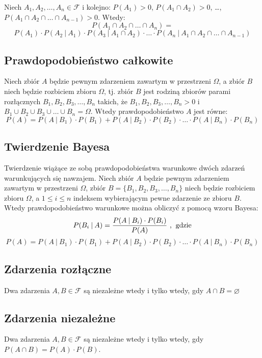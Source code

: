 \documentclass[14pt,a4paper]{extarticle}
\begin{document}
\noindent Niech $A_{1}, A_{2}, \ldots, A_{n} \in \mathcal{F}$ i kolejno: $P(A_{1})>0$, 
$P(A_{1}\cap A_{2}) > 0$, \ldots, $P(A_{1}\cap A_{2} \cap \ldots \cap A_{n-1}) > 0$. Wtedy:
\[P(A_{1}\cap A_{2}\cap \ldots\cap A_{n}) = \]
\[P(A_{1}) \cdot P(A_{2} \:\vert\: A_{1}) \cdot P(A_{3} \:\vert\: A_{1} \cap A_{2}) \cdot \ldots \cdot P(A_{n}\:\vert\:A_{1}\cap A_{2}\cap \ldots\cap A_{n-1})\]

\newpage
\subsection{Prawdopodobieństwo całkowite}
Niech zbiór $A$ będzie pewnym zdarzeniem zawartym w przestrzeni $\Omega$, a zbiór
$B$ niech będzie rozbiciem zbioru $\Omega$, tj. zbiór $B$ jest rodziną zbiorów parami rozłącznych
$B_{1}, B_{2}, B_{3}, \ldots, B_{n}$ takich, że $B_{1}, B_{2}, B_{3}, \ldots, B_{n} > 0$ i 
$B_{1}\cup B_{2}\cup B_{3}\cup \ldots\cup B_{n} = \Omega$. Wtedy prawdopodobieństwo $A$ jest równe:
\[P(A) = P(A\:\vert\:B_{1})\cdot P(B_{1}) + P(A\:\vert\:B_{2})\cdot P(B_{2}) \cdot \ldots \cdot P(A\:\vert\:B_{n})\cdot P(B_{n})\]


\subsection{Twierdzenie Bayesa}
Twierdzenie wiążące ze sobą prawdopodobieństwa warunkowe dwóch zdarzeń warunkujących
się nawzajem. Niech zbiór $A$ będzie pewnym zdarzeniem zawartym w przestrzeni $\Omega$, zbiór
$B = \{B_{1}, B_{2}, B_{3}, \ldots, B_{n}\}$ niech będzie rozbiciem zbioru $\Omega$, a $1 \leq i \leq n$
indeksem wybierającym pewne zdarzenie ze zbioru $B$. Wtedy prawdopodobieństwo warunkowe można
obliczyć z pomocą wzoru Bayesa:
\[P(B_{i}\:\vert\:A) = \dfrac{P(A\:\vert\:B_{i})\cdot P(B_{i})}{P(A)}\text{ ,\:   gdzie}\]
\[P(A) = P(A\:\vert\:B_{1})\cdot P(B_{1}) + P(A\:\vert\:B_{2})\cdot P(B_{2}) \cdot \ldots \cdot P(A\:\vert\:B_{n})\cdot P(B_{n})\]

\subsection{Zdarzenia rozłączne}
Dwa zdarzenia $A, B \in \mathcal{F}$ są niezależne wtedy i tylko wtedy, gdy $A \cap B = \varnothing$

\subsection{Zdarzenia niezależne}
Dwa zdarzenia $A, B \in \mathcal{F}$ są niezależne wtedy i tylko wtedy, gdy $P(A \cap B) = P(A)\cdot P(B)$.
\end{document}
